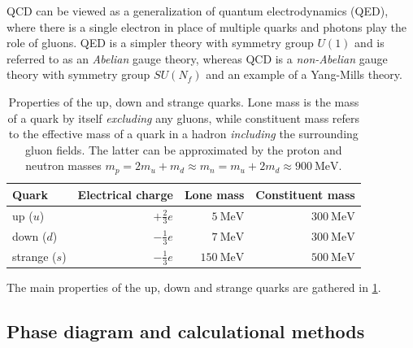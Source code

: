 QCD can be viewed as a generalization of quantum electrodynamics (QED),
where there is a single electron in place of multiple quarks and photons play the role of gluons.
QED is a simpler theory with symmetry group $U(1)$ and is referred to as an \emph{Abelian} gauge theory,
whereas QCD is a \emph{non-Abelian} gauge theory with symmetry group $SU(N_f)$ and an example of a Yang-Mills theory.

\begin{table}[b]
\centering
{ \renewcommand{\arraystretch}{1.2} %
\begin{tabular}{ l r r r }
	\toprule
	Quark & Electrical charge & Lone mass & Constituent mass \\
	\midrule
	up ($u$) & $+\frac23 e$ & $\SI{5}{\mega\electronvolt}$ & \approx \, $\SI{300}{\mega\electronvolt}$ \\
	down ($d$) & $-\frac13 e$ & $\SI{7}{\mega\electronvolt}$ & \approx \, $\SI{300}{\mega\electronvolt}$ \\
	strange ($s$) & $-\frac13 e$ & $\SI{150}{\mega\electronvolt}$ & \approx \, $\SI{500}{\mega\electronvolt}$ \\
	\bottomrule
\end{tabular} }
\caption{\label{tab:qcd:quark_properties}%
	Properties of the up, down and strange quarks.
	Lone mass is the mass of a quark by itself \emph{excluding} any gluons,
	while constituent mass refers to the effective mass of a quark in a hadron \emph{including} the surrounding gluon fields.
	The latter can be approximated by the proton and neutron masses $m_p = 2 m_u + m_d \approx m_n = m_u + 2 m_d \approx \SI{900}{\mega\electronvolt}$.
	\cite{ref:pdg_review_2021,ref:glendenning}
}
\end{table}

The main properties of the up, down and strange quarks are gathered in \cref{tab:qcd:quark_properties}.

\subsection*{Phase diagram and calculational methods}

